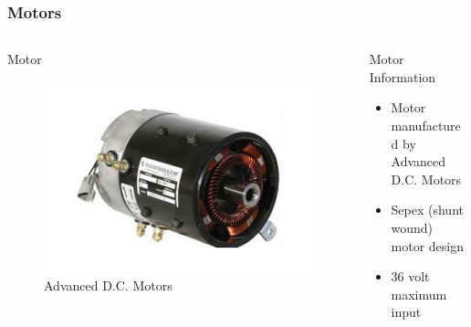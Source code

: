 \documentclass{beamer}
\begin{document}
\begin{frame}
	\frametitle{Motors}
	\begin{columns}[T]
		\begin{column}{0.5\textwidth}
			\begin{block}{Motor}
				\begin{figure}
					\centering 
					\includegraphics[scale=.2]{figures/motorpic.pdf}
					\caption{Advanced D.C. Motors} 
				\end{figure}
			\end{block}
		\end{column}		
		\begin{column}{0.5\textwidth}
			\begin{block}{Motor Information}
				\begin{itemize}
					\item Motor manufactured by Advanced D.C. Motors
					\item Sepex (shunt wound) motor design
					\item 36 volt maximum input
				\end{itemize}
			\end{block}	
		\end{column}
	\end{columns}							
\end{frame}
\end{document}
